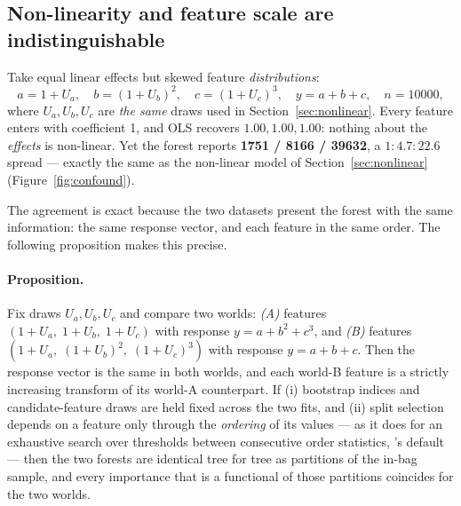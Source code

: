 \subsection{Non-linearity and feature scale are indistinguishable}
\label{sec:confound}

Take equal linear effects but
skewed feature \emph{distributions}:
\[
  a = 1 + U_a, \quad b = (1 + U_b)^2, \quad c = (1 + U_c)^3, \quad y = a + b +
  c,
  \quad n = 10000,
\]
where $U_a, U_b, U_c$ are \emph{the same} draws used in
Section~\ref{sec:nonlinear}. Every feature enters with coefficient 1, and OLS
recovers $1.00, 1.00, 1.00$: nothing about the \emph{effects} is non-linear. Yet
the forest reports \textbf{1751 / 8166 / 39632}, a $1:4.7:22.6$ spread
--- exactly the same as the non-linear model of
Section~\ref{sec:nonlinear} (Figure~\ref{fig:confound}).

The agreement is exact because the two datasets present the forest with the
same information: the same response vector, and each feature in the same
order. The following proposition makes this precise.

\paragraph{Proposition.} Fix draws $U_a, U_b, U_c$ and compare two worlds:
\emph{(A)} features $(1{+}U_a,\; 1{+}U_b,\; 1{+}U_c)$ with response
$y = a + b^2 + c^3$, and \emph{(B)} features
$(1{+}U_a,\; (1{+}U_b)^2,\; (1{+}U_c)^3)$ with response $y = a + b + c$. Then
the
response vector is the same in both worlds, and each world-B feature is a
strictly increasing transform of its world-A counterpart. If (i) bootstrap
indices and candidate-feature draws are held fixed across the two fits, and
(ii) split selection depends on a feature only through the \emph{ordering} of
its values --- as it does for an exhaustive search over thresholds between
consecutive order statistics, 's default
 --- then the two forests are identical tree for
tree as partitions of the in-bag sample, and every importance that is a
functional of those partitions coincides for the two worlds.


